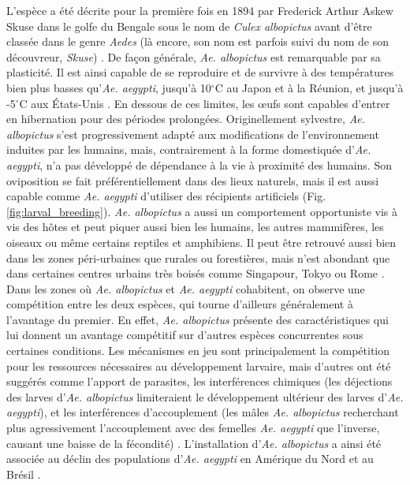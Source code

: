 L'espèce a été décrite pour la première fois en 1894 par Frederick Arthur Askew Skuse dans le golfe du Bengale sous le nom de {\em Culex albopictus} avant d'être classée dans le genre {\em Aedes} (là encore, son nom est parfois suivi du nom de son découvreur, {\em Skuse}) \cite{skuse1894banded}. 
De façon générale, {\em Ae. albopictus} est remarquable par sa plasticité. 
Il est ainsi capable de se reproduire et de survivre à des températures bien plus basses qu'{\em Ae. aegypti}, jusqu'à 10$^\circ$C au Japon et à la Réunion, et jusqu'à -5$^\circ$C aux États-Unis \cite{paupy2009aedes}. 
En dessous de ces limites, les \oe ufs sont capables d'entrer en hibernation pour des périodes prolongées.
Originellement sylvestre, {\em Ae. albopictus} s'est progressivement adapté aux modifications de l'environnement induites par les humains, mais, contrairement à la forme domestiquée d'{\em Ae. aegypti}, n'a pas développé de dépendance à la vie à proximité des humains.
Son oviposition se fait préférentiellement dans des lieux naturels, mais il est aussi capable comme {\em Ae. aegypti} d'utiliser des récipients artificiels (Fig. \ref{fig:larval_breeding}).
{\em Ae. albopictus} a aussi un comportement opportuniste vis à vis des hôtes et peut piquer aussi bien les humains, les autres mammifères, les oiseaux ou même certains reptiles et amphibiens.
Il peut être retrouvé aussi bien dans les zones péri-urbaines que rurales ou forestières, mais n'est abondant que dans certaines centres urbains très boisés comme Singapour, Tokyo ou Rome \cite{paupy2009aedes}.
Dans les zones où {\em Ae. albopictus} et {\em Ae. aegypti} cohabitent, on observe une compétition entre les deux espèces, qui tourne d'ailleurs généralement à l'avantage du premier.
En effet, {\em Ae. albopictus} présente des caractéristiques qui lui donnent un avantage compétitif sur d'autres espèces concurrentes sous certaines conditions.
Les mécanismes en jeu sont principalement la compétition pour les ressources nécessaires au développement larvaire, mais d'autres ont été suggérés comme l'apport de parasites, les interférences chimiques (les déjections des larves d'{\em Ae. albopictus} limiteraient le développement ultérieur des larves d'{\em Ae. aegypti}), et les interférences d'accouplement (les mâles {\em Ae. albopictus} recherchant plus agressivement l'accouplement avec des femelles {\em Ae. aegypti} que l'inverse, causant une baisse de la fécondité) \cite{juliano2005ecology}.
L'installation d'{\em Ae. albopictus} a ainsi été associée au déclin des populations d'{\em Ae. aegypti} en Amérique du Nord et au Brésil \cite{paupy2009aedes}.



